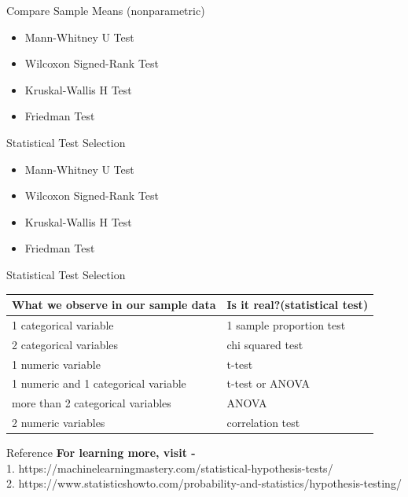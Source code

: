 \begin{frame}[t]{Compare Sample Means (nonparametric)}
	\begin{itemize}	
		\item Mann-Whitney U Test
		\item Wilcoxon Signed-Rank Test
		\item Kruskal-Wallis H Test
		\item Friedman Test
	\end{itemize}
\end{frame}
\begin{frame}[t]{Statistical Test Selection}
	\begin{itemize}	
		\item Mann-Whitney U Test
		\item Wilcoxon Signed-Rank Test
		\item Kruskal-Wallis H Test
		\item Friedman Test
	\end{itemize}
\end{frame}

\begin{frame}[t]{Statistical Test Selection}
	\begin{tabular}{l l}
		
		\textbf{What we observe in our sample data} & \textbf{Is it real?(statistical test)} \\
		\hline
		1 categorical variable & 1 sample proportion test  \\
		2 categorical variables & chi squared test \\
		1 numeric variable	& t-test \\
		1 numeric and 1 categorical variable & t-test or ANOVA \\
		more than 2 categorical variables & ANOVA \\
		2 numeric variables & correlation test \\
		
	\end{tabular}

\end{frame}

\begin{frame}[t]{Reference}
	\textbf{For learning more, visit -} \\
	1. https://machinelearningmastery.com/statistical-hypothesis-tests/   \\
	
	2. https://www.statisticshowto.com/probability-and-statistics/hypothesis-testing/
\end{frame}


